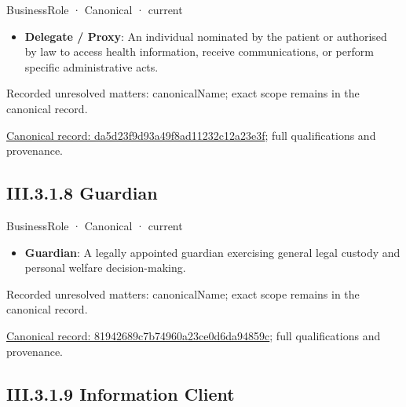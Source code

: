 \label{element:da5d23f9d93a49f8ad11232c12a23e3f}
{\small BusinessRole · Canonical · current}\par

\begin{itemize}


\item \textbf{Delegate / Proxy}: An individual nominated by the patient or authorised by law to access health information, receive communications, or perform specific administrative acts.

\end{itemize}

{\small Recorded unresolved matters: canonicalName; exact scope remains in the canonical record.}\par
{\footnotesize \href{../../../../continuum/business/business-role/da5d23f9d93a49f8ad11232c12a23e3f.md}{Canonical record: da5d23f9d93a49f8ad11232c12a23e3f}; full qualifications and provenance.}\par
\subsection*{III.3.1.8 Guardian}
\label{navigation:III.3.1.8}

\label{element:81942689c7b74960a23ce0d6da94859c}
{\small BusinessRole · Canonical · current}\par

\begin{itemize}


\item \textbf{Guardian}: A legally appointed guardian exercising general legal custody and personal welfare decision-making.

\end{itemize}

{\small Recorded unresolved matters: canonicalName; exact scope remains in the canonical record.}\par
{\footnotesize \href{../../../../continuum/business/business-role/81942689c7b74960a23ce0d6da94859c.md}{Canonical record: 81942689c7b74960a23ce0d6da94859c}; full qualifications and provenance.}\par
\subsection*{III.3.1.9 Information Client}
\label{navigation:III.3.1.9}


